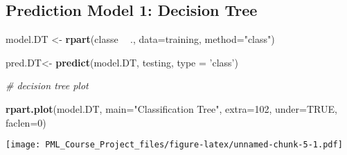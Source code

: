 \documentclass[
]{article}
\newenvironment{Shaded}{\begin{snugshade}}{\end{snugshade}}
\newcommand{\CommentTok}[1]{\textcolor[rgb]{0.56,0.35,0.01}{\textit{#1}}}
\newcommand{\DataTypeTok}[1]{\textcolor[rgb]{0.13,0.29,0.53}{#1}}
\newcommand{\DecValTok}[1]{\textcolor[rgb]{0.00,0.00,0.81}{#1}}
\newcommand{\KeywordTok}[1]{\textcolor[rgb]{0.13,0.29,0.53}{\textbf{#1}}}
\newcommand{\NormalTok}[1]{#1}
\newcommand{\OperatorTok}[1]{\textcolor[rgb]{0.81,0.36,0.00}{\textbf{#1}}}
\newcommand{\OtherTok}[1]{\textcolor[rgb]{0.56,0.35,0.01}{#1}}
\newcommand{\StringTok}[1]{\textcolor[rgb]{0.31,0.60,0.02}{#1}}
\begin{document}
\hypertarget{prediction-model-1-decision-tree}{%
\subsection{Prediction Model 1: Decision
Tree}\label{prediction-model-1-decision-tree}}

\begin{Shaded}
\begin{Highlighting}[]
\NormalTok{model.DT <-}\StringTok{ }\KeywordTok{rpart}\NormalTok{(classe }\OperatorTok{~}\StringTok{ }\NormalTok{., }\DataTypeTok{data=}\NormalTok{training, }\DataTypeTok{method=}\StringTok{"class"}\NormalTok{)}

\NormalTok{pred.DT<-}\StringTok{ }\KeywordTok{predict}\NormalTok{(model.DT, testing, }\DataTypeTok{type =} \StringTok{'class'}\NormalTok{)}

\CommentTok{# decision tree plot}

\KeywordTok{rpart.plot}\NormalTok{(model.DT, }\DataTypeTok{main=}\StringTok{"Classification Tree"}\NormalTok{, }\DataTypeTok{extra=}\DecValTok{102}\NormalTok{, }\DataTypeTok{under=}\OtherTok{TRUE}\NormalTok{, }\DataTypeTok{faclen=}\DecValTok{0}\NormalTok{)}
\end{Highlighting}
\end{Shaded}

\texttt{[image: PML\_Course\_Project\_files/figure-latex/unnamed-chunk-5-1.pdf]}

\begin{Shaded}
\end{Shaded}
\end{document}
